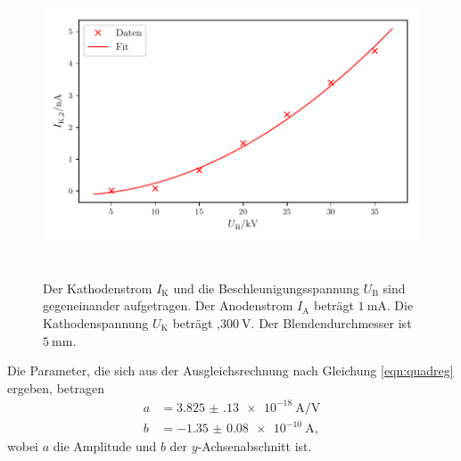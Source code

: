 \begin{figure}
    \centering
    \includegraphics[width=15cm, height=9cm]{build/plot4.pdf}
    \caption{Der Kathodenstrom $I_\text{K}$ und die Beschleunigungsspannung $U_\text{B}$ sind gegeneinander aufgetragen. Der Anodenstrom $I_\text{A}$ beträgt $\SI{1}{\milli\ampere}$. Die Kathodenspannung $U_\text{K}$ beträgt ,$\SI{300}{\volt}$. Der Blendendurchmesser ist $\SI{5}{\milli\meter}.$}
    \label{fig:plot4}
\end{figure}

\noindent Die Parameter, die sich aus der Ausgleichsrechnung nach Gleichung \eqref{eqn:quadreg} ergeben, betragen
\begin{align*}
    a &= \SI{3.825(130)e-18}{\ampere\per\volt}\\
    b &= \SI{-1.35(8)e-10}{\ampere},
\end{align*}
wobei $a$ die Amplitude und $b$ der $y$-Achsenabschnitt ist.

